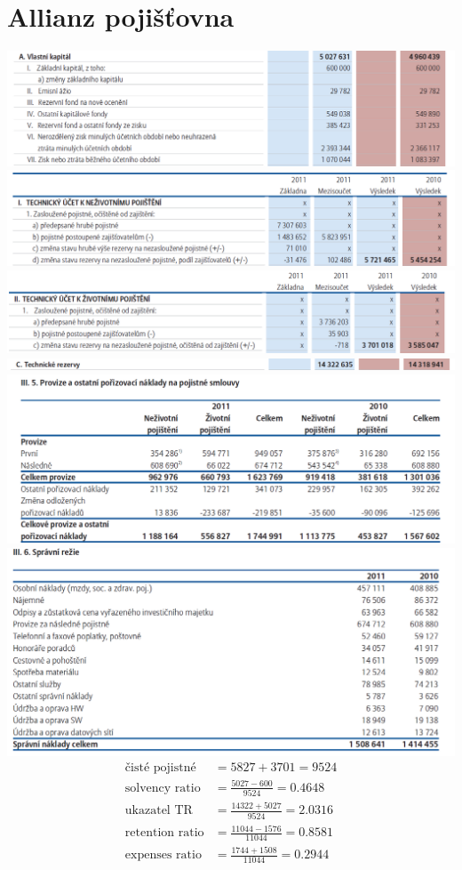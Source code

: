 \documentclass[12pt,oneside]{fithesis}
\begin{document}
\section{Allianz pojišťovna}
\includegraphics[width=1.0\textwidth]{al-vlk.png}
\includegraphics[width=1.0\textwidth]{al-poj1.png}
\includegraphics[width=1.0\textwidth]{al-poj2.png}
\includegraphics[width=1.0\textwidth]{al-tr.png}
\includegraphics[width=1.0\textwidth]{al-nakl1.png}
\includegraphics[width=1.0\textwidth]{al-nakl2.png}
\begin{align*}
	\text{čisté pojistné}&=5827+3701=9524\\
	\text{solvency ratio}&=\frac{5027-600}{9524}=0.4648\\
	\text{ukazatel TR}&=\frac{14322+5027}{9524}=2.0316\\
	\text{retention ratio}&=\frac{11044-1576}{11044}=0.8581\\
	\text{expenses ratio}&=\frac{1744+1508}{11044}=0.2944\\
\end{align*}
\end{document}
